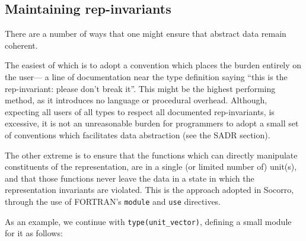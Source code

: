 \subsection{Maintaining rep-invariants}

There are a number of ways that one might ensure that abstract data
remain coherent.

The easiest of which is to adopt a convention which places the burden
entirely on the user--- a line of documentation near the type
definition saying ``this is the rep-invariant: please don't break
it''.  This might be the highest performing method, as it introduces
no language or procedural overhead.  Although, expecting all users of
all types to respect all documented rep-invariants, is excessive, it
is not an unreasonable burden for programmers to adopt a small set of
conventions which facilitates data abstraction (see the SADR section).

The other extreme is to ensure that the functions which can directly
manipulate constituents of the representation, are in a single (or
limited number of) unit(s), and that those functions never leave the
data in a state in which the representation invariants are violated.
This is the approach adopted in Socorro, through the use of FORTRAN's
\verb+module+ and \verb+use+ directives.

As an example, we continue with \verb+type(unit_vector)+, defining
a small module for it as follows:

